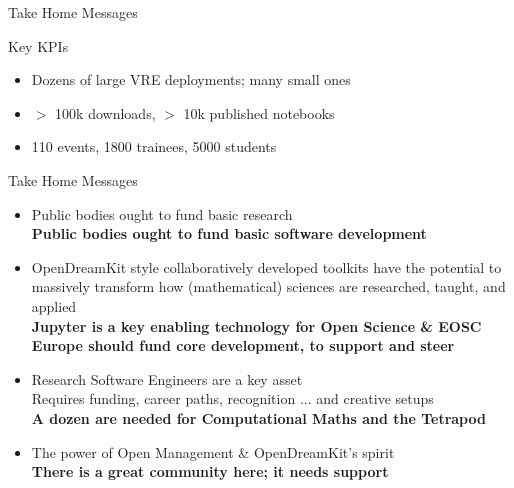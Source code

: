 \documentclass[svgnames]{beamer}
\begin{document}
\begin{frame}{Take Home Messages}
  \begin{block}{Key KPIs}
    \begin{itemize}
    \item Dozens of large VRE deployments; many small ones
    \item $>$ 100k downloads, $>$ 10k published notebooks
    \item 110 events, 1800 trainees, 5000 students
    \end{itemize}
  \end{block}
\end{frame}
\begin{frame}{Take Home Messages}
  \begin{itemize}
  \item Public bodies ought to fund basic research\\
    \textbf{\color{red}Public bodies ought to fund basic software development}
    \bigskip\pause

  \item OpenDreamKit style collaboratively developed toolkits have the
    potential to massively transform how (mathematical) sciences are
    researched, taught, and applied\\
    \medskip\pause
    \textbf{\color{red}Jupyter is a key enabling technology for Open Science \& EOSC\\
      Europe should fund core development, to support and steer}
    \bigskip\pause

  \item Research Software Engineers are a key asset\\
    Requires funding, career paths, recognition ... and creative setups\\
    \medskip
    \textbf{\color{red}A dozen are needed for Computational Maths and the Tetrapod}
    \bigskip\pause

  \item The power of Open Management \& OpenDreamKit's spirit\\
    \pause\smallskip
    \textbf{\color{red}There is a great community here; it needs support}
  \end{itemize}
\end{frame}
\end{document}
